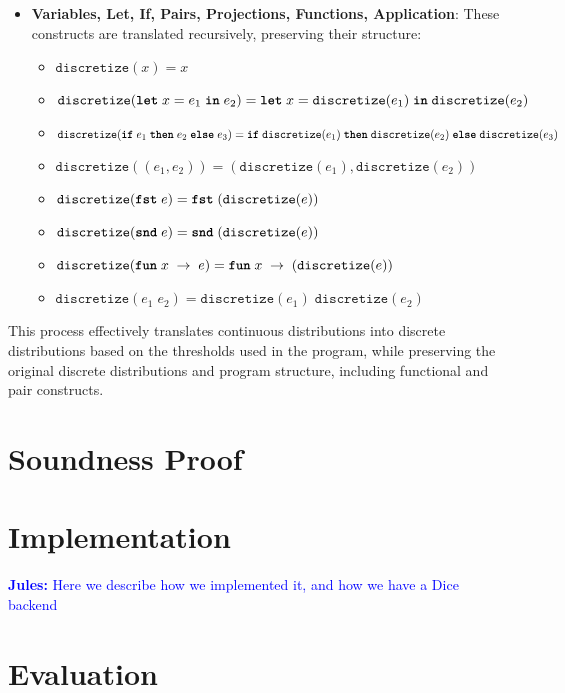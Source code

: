 \documentclass[acmsmall,screen,dvipsnames,x11names,nonacm,anonymous,review]{acmart}
\newcommand{\jules}[1]{\textcolor{blue}{\textbf{Jules:} #1}}
\newcommand{\letkw}{\text{\ttfamily\bfseries let}}
\newcommand{\inkw}{\text{\ttfamily\bfseries in}}
\newcommand{\ifkw}{\text{\ttfamily\bfseries if}}
\newcommand{\thenkw}{\text{\ttfamily\bfseries then}}
\newcommand{\elsekw}{\text{\ttfamily\bfseries else}}
\newcommand{\fstkw}{\text{\ttfamily\bfseries fst}}
\newcommand{\sndkw}{\text{\ttfamily\bfseries snd}}
\newcommand{\funkw}{\text{\ttfamily\bfseries fun}}
\begin{document}
\begin{itemize}
    \item \textbf{Variables, Let, If, Pairs, Projections, Functions, Application}: These constructs are translated recursively, preserving their structure:
    \begin{itemize}
        \item $\texttt{discretize}(x) = x$
        \item $\texttt{discretize}(\letkw \; x = e_1 \; \inkw \; e_2) = \letkw \; x = \texttt{discretize}(e_1) \; \inkw \; \texttt{discretize}(e_2)$
        \item $\texttt{discretize}(\ifkw \; e_1 \; \thenkw \; e_2 \; \elsekw \; e_3) = \ifkw \; \texttt{discretize}(e_1) \; \thenkw \; \texttt{discretize}(e_2) \; \elsekw \; \texttt{discretize}(e_3)$
        \item $\texttt{discretize}((e_1, e_2)) = (\texttt{discretize}(e_1), \texttt{discretize}(e_2))$
        \item $\texttt{discretize}(\fstkw \; e) = \fstkw \; (\texttt{discretize}(e))$
        \item $\texttt{discretize}(\sndkw \; e) = \sndkw \; (\texttt{discretize}(e))$
        \item $\texttt{discretize}(\funkw \; x \; \rightarrow \; e) = \funkw \; x \; \rightarrow \; (\texttt{discretize}(e))$
        \item $\texttt{discretize}(e_1 \; e_2) = \texttt{discretize}(e_1) \; \texttt{discretize}(e_2)$
    \end{itemize}
\end{itemize}

This process effectively translates continuous distributions into discrete distributions based on the thresholds used in the program, while preserving the original discrete distributions and program structure, including functional and pair constructs.

\section{Soundness Proof}\label{sec:soundness}


\section{Implementation}\label{sec:implementation}

\jules{Here we describe how we implemented it, and how we have a Dice backend}


\section{Evaluation}\label{sec:evaluation}
\end{document}
